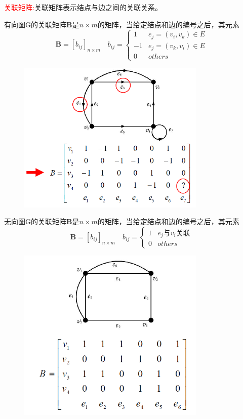 \documentclass[11pt,a4paper,openany]{book}
\begin{document}
\textcolor{red}{关联矩阵:}关联矩阵表示结点与边之间的关联关系。\\
\begin{shaded}
有向图G的关联矩阵$\mathbf{B}$是$n\times m$的矩阵，当给定结点和边的编号之后，其元素
$$\mathbf{B}=[b_{ij}]_{n \times m} \quad b_{ij}=
\begin{cases}
        1& e_j=(v_i,v_k)\in E\\
        -1& e_j=(v_k,v_i)\in E\\
        0& others
    \end{cases}
$$
\end{shaded}
\begin{figure}[H]
  \centering
  \includegraphics[width=0.8\textwidth]{1.11.png}\\
  \caption{}
\end{figure}
\begin{shaded}
无向图G的关联矩阵$\mathbf{B}$是$n\times m$的矩阵，当给定结点和边的编号之后，其元素
$$\mathbf{B}=[b_{ij}]_{n \times m} \quad b_{ij}=
\begin{cases}
        1& e_j \text{与}v_i\text{关联}\\
        0& others
    \end{cases}
$$
\end{shaded}
\begin{figure}[H]
  \centering
  \includegraphics[width=0.8\textwidth]{1.12.png}\\
  \caption{}
\end{figure}
\end{document}

